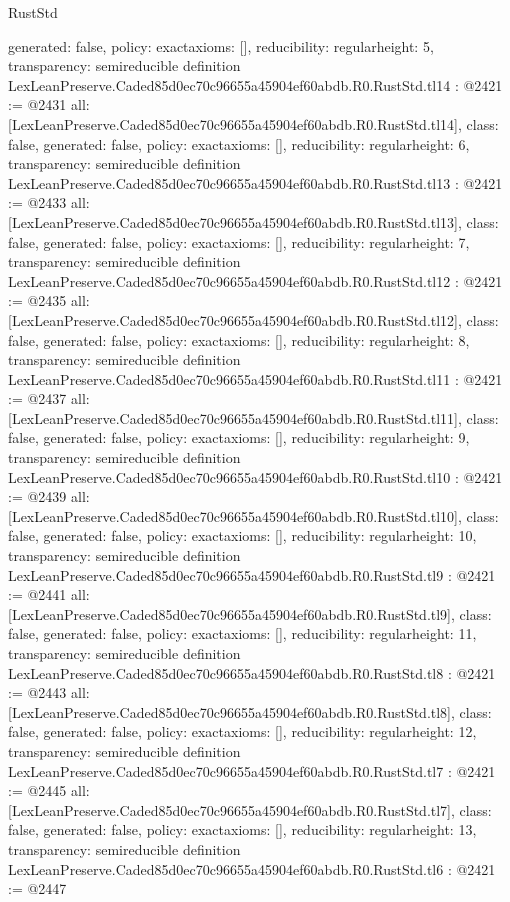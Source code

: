 \begin{lexlean}{RustStd}
\begin{coremodule}
{  generated: false,
  policy: exact{axioms: []},
  reducibility: regular{height: 5},
  transparency: semireducible
}
definition LexLeanPreserve.Caded85d0ec70c96655a45904ef60abdb.R0.RustStd.tl14 : @2421 := @2431 {
  all: [LexLeanPreserve.Caded85d0ec70c96655a45904ef60abdb.R0.RustStd.tl14],
  class: false,
  generated: false,
  policy: exact{axioms: []},
  reducibility: regular{height: 6},
  transparency: semireducible
}
definition LexLeanPreserve.Caded85d0ec70c96655a45904ef60abdb.R0.RustStd.tl13 : @2421 := @2433 {
  all: [LexLeanPreserve.Caded85d0ec70c96655a45904ef60abdb.R0.RustStd.tl13],
  class: false,
  generated: false,
  policy: exact{axioms: []},
  reducibility: regular{height: 7},
  transparency: semireducible
}
definition LexLeanPreserve.Caded85d0ec70c96655a45904ef60abdb.R0.RustStd.tl12 : @2421 := @2435 {
  all: [LexLeanPreserve.Caded85d0ec70c96655a45904ef60abdb.R0.RustStd.tl12],
  class: false,
  generated: false,
  policy: exact{axioms: []},
  reducibility: regular{height: 8},
  transparency: semireducible
}
definition LexLeanPreserve.Caded85d0ec70c96655a45904ef60abdb.R0.RustStd.tl11 : @2421 := @2437 {
  all: [LexLeanPreserve.Caded85d0ec70c96655a45904ef60abdb.R0.RustStd.tl11],
  class: false,
  generated: false,
  policy: exact{axioms: []},
  reducibility: regular{height: 9},
  transparency: semireducible
}
definition LexLeanPreserve.Caded85d0ec70c96655a45904ef60abdb.R0.RustStd.tl10 : @2421 := @2439 {
  all: [LexLeanPreserve.Caded85d0ec70c96655a45904ef60abdb.R0.RustStd.tl10],
  class: false,
  generated: false,
  policy: exact{axioms: []},
  reducibility: regular{height: 10},
  transparency: semireducible
}
definition LexLeanPreserve.Caded85d0ec70c96655a45904ef60abdb.R0.RustStd.tl9 : @2421 := @2441 {
  all: [LexLeanPreserve.Caded85d0ec70c96655a45904ef60abdb.R0.RustStd.tl9],
  class: false,
  generated: false,
  policy: exact{axioms: []},
  reducibility: regular{height: 11},
  transparency: semireducible
}
definition LexLeanPreserve.Caded85d0ec70c96655a45904ef60abdb.R0.RustStd.tl8 : @2421 := @2443 {
  all: [LexLeanPreserve.Caded85d0ec70c96655a45904ef60abdb.R0.RustStd.tl8],
  class: false,
  generated: false,
  policy: exact{axioms: []},
  reducibility: regular{height: 12},
  transparency: semireducible
}
definition LexLeanPreserve.Caded85d0ec70c96655a45904ef60abdb.R0.RustStd.tl7 : @2421 := @2445 {
  all: [LexLeanPreserve.Caded85d0ec70c96655a45904ef60abdb.R0.RustStd.tl7],
  class: false,
  generated: false,
  policy: exact{axioms: []},
  reducibility: regular{height: 13},
  transparency: semireducible
}
definition LexLeanPreserve.Caded85d0ec70c96655a45904ef60abdb.R0.RustStd.tl6 : @2421 := @2447 {
}
\end{coremodule}
\end{lexlean}

